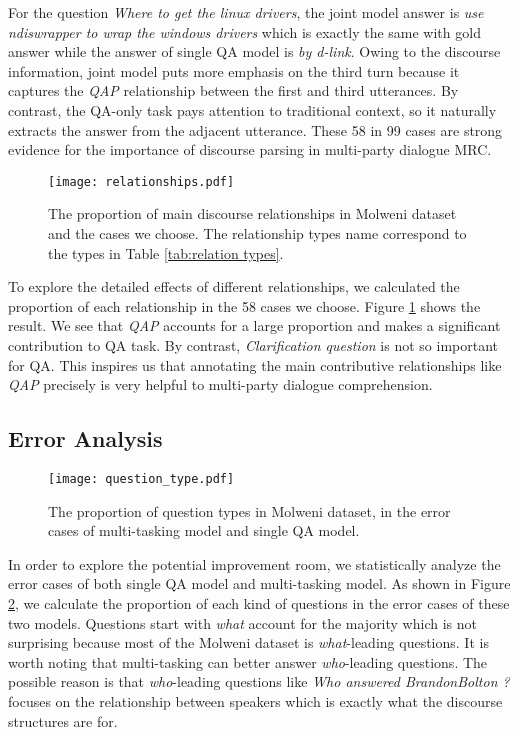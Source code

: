 \documentclass[11pt]{article}
\begin{document}
For the question \textit{Where to get the linux drivers}, the joint model answer is 
\textit{use ndiswrapper to wrap the windows drivers} which is exactly the same with gold answer while the answer of single QA model is \textit{by d-link}. Owing to the discourse information, joint model puts more emphasis on the third turn because it captures the \textit{QAP} relationship between the first and third utterances. By contrast, the QA-only task pays attention to traditional context, so it naturally extracts the answer from the adjacent utterance. These 58 in 99 cases are strong evidence for the importance of discourse parsing in multi-party dialogue MRC.

\begin{figure}[ht]
		\centering
		\texttt{[image: relationships.pdf]}
		\caption{\label{fig:relationships proportion}The proportion of main discourse relationships in Molweni dataset and the cases we choose. The relationship types name correspond to the types in Table \ref{tab:relation types}.}
\end{figure}
To explore the detailed effects of different relationships, we calculated the proportion of each relationship in the 58 cases we choose. Figure \ref{fig:relationships proportion} shows the result. We see that \textit{QAP} accounts for a large proportion and makes a significant contribution to QA task. By contrast, \textit{Clarification question} is not so important for QA.
This inspires us that annotating the main contributive relationships like \textit{QAP} precisely is very helpful to multi-party dialogue comprehension.


\subsection{Error Analysis}\label{subsubsec:error analysis}
\begin{figure}[ht]
		\centering
		\texttt{[image: question\_type.pdf]}
		\caption{\label{fig:question proportion}The proportion of question types in Molweni dataset, in the error cases of multi-tasking model and single QA model.}
\end{figure}
In order to explore the potential improvement room, we statistically analyze the error cases of both single QA model and multi-tasking model. As shown in Figure \ref{fig:question proportion}, we calculate the proportion of each kind of questions in the error cases of these two models. Questions start with \textit{what} account for the majority which is not surprising because most of the Molweni dataset is \textit{what}-leading questions. It is worth noting that multi-tasking can better answer \textit{who}-leading questions. The possible reason is that \textit{who}-leading questions like \textit{Who answered BrandonBolton ?} focuses on the relationship between speakers which is exactly what the discourse structures are for.
\end{document}
